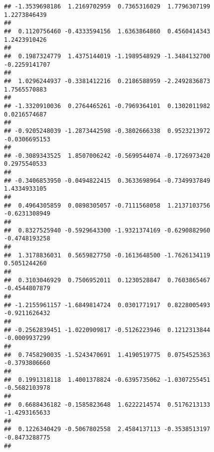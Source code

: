 \documentclass[]{article}
\begin{document}
\begin{verbatim}
## -1.3539698186  1.2169702959  0.7365316029  1.7796307199  1.2273846439 
##                                                                       
##  0.1120756460 -0.4333594156  1.6363864860  0.4560414343  1.2423910426 
##                                                                       
##  0.1987324779  1.4375144019 -1.1989548929 -1.3484132700 -0.2259141707 
##                                                                       
##  1.0296244937 -0.3381412216  0.2186588959 -2.2492836873  1.7565570883 
##                                                                       
## -1.3320910036  0.2764465261 -0.7969364101  0.1302011982  0.0216574687 
##                                                                       
## -0.9205248039 -1.2873442598 -0.3802666338  0.9523213972 -0.0306695153 
##                                                                       
## -0.3089343525  1.8507006242 -0.5699544074 -0.1726973420  0.2975540533 
##                                                                       
## -0.3406853950 -0.0494822415  0.3633698964 -0.7349937849  1.4334933105 
##                                                                       
##  0.4964305859  0.0898305057 -0.7111568058  1.2137103756 -0.6231308949 
##                                                                       
##  0.8327525940 -0.5929643300 -1.9321374169 -0.6290882960 -0.4748193258 
##                                                                       
##  1.3178836031  0.5659827750 -0.1613648500 -1.7626134119  0.5051244260 
##                                                                       
##  0.3103046929  0.7506952011  0.1230528847  0.7603865467 -0.4544807879 
##                                                                       
## -1.2155961157 -1.6849814724  0.0301771917  0.8228005493 -0.9211626432 
##                                                                       
## -0.2562839451 -1.0220909817 -0.5126223946  0.1212313844 -0.0009937299 
##                                                                       
##  0.7458290035 -1.5243470691  1.4190519775  0.0754525363 -0.3793806660 
##                                                                       
##  0.1991318118  1.4001378824 -0.6395735062 -1.0307255451 -0.5682103978 
##                                                                       
##  0.6688436182 -0.1585823648  1.6222214574  0.5176213133 -1.4293165633 
##                                                                       
##  0.1226340429 -0.5067802558  2.4584137113 -0.3538513197 -0.8473288775 
##                                                                       

\end{verbatim}
\end{document}
